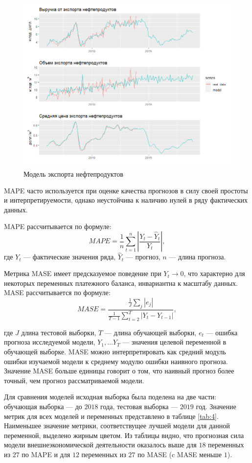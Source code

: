 \documentclass[a4paper, 14pt]{extarticle}
\newcommand{\lsum}{\sum\limits}
\begin{document}
\begin{figure}[htp!]
	\centering
	\includegraphics[width=19cm]{op_model.png}
	\caption{Модель экспорта нефтепродуктов}\label{fi:op_model}
\end{figure}

\newpage 

MAPE часто используется при оценке качества прогнозов в силу своей простоты и интерпретируемости, однако неустойчива к наличию нулей в ряду фактических данных. 

MAPE рассчитывается по формуле:
\[
MAPE = \frac{1}{n}\lsum_{t=1}^{n}\left|\frac{Y_t - \hat Y_t}{Y_t}\right|,
\]
где $Y_t$ — фактические значения ряда, $\hat Y_t$ — прогноз, $n$ — длина прогноза.

Метрика MASE имеет предсказуемое поведение при $Y_t \to 0$, что характерно для некоторых переменных платежного баланса, инвариантна к масштабу данных.
MASE рассчитывается по формуле:
\[
MASE = \frac{\frac{1}{J} \lsum_j |e_j|}{\frac{1}{T-1} \lsum_{t=2}^T|Y_t - Y_{t-1}|},
\]

где $J$ длина тестовой выборки, $T$ — длина обучающей выборки, $e_t$ — ошибка прогноза исследуемой модели, $Y_1, \ldots Y_T$ — значения целевой переменной в обучающей выборке. 
MASE можно интерпретировать как средний модуль ошибки изучаемой модели к среднему модулю ошибки наивного прогноза.
Значение MASE больше единицы говорит о том, что наивный прогноз более точный, чем прогноз рассматриваемой модели.

Для сравнения моделей исходная выборка была поделена на две части: обучающая выборка — до $2018$ года, тестовая выборка — $2019$ год.
Значение метрик для всех моделей и переменных представлено в таблице \ref{tab:4}.
Наименьшее значение метрики, соответствущее лучшей модели для данной переменной, выделено жирным цветом.
Из таблицы видно, что прогнозная сила модели внешнеэкономической деятельности оказалось выше для $18$ переменных из $27$ по MAPE и для $12$ переменных из $27$ по MASE (c MASE меньше $1$).
\end{document}
